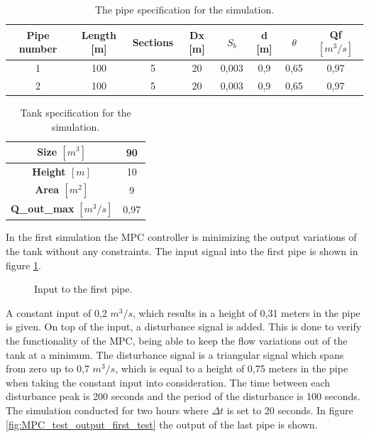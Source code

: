 \begin{table}[H]
\centering
\begin{tabular}{|c|c|c|c|c|c|c|c|}
\hline
	\rowcolor[HTML]{9B9B9B} 
\textbf{Pipe number} & \textbf{Length} [m] & \textbf{Sections} & \textbf{Dx} [m] & \textbf{$S_b$} & \textbf{d} [m] & \textbf{$\theta$} & \textbf{Qf $[m^3/s]$} \\ \hline
1&100             & 5                 & 20          & 0,003       & 0,9        & 0,65              & 0,97        \\ \hline
2&100             & 5                 & 20          & 0,003       & 0,9        & 0,65              & 0,97        \\ \hline
\end{tabular}
\caption{The pipe specification for the simulation.}
\label{tab:pipe_data_for_mpc_test}
\end{table}
\begin{table}[H]
\centering
\begin{tabular}{|c|c|}
\hline
\textbf{Size $[m^3]$}        & 90   \\ \hline
\textbf{Height $[m]$}      & 10   \\ \hline
\textbf{Area $[m^2]$}        & 9    \\ \hline
\textbf{Q\_out\_max} $[m^3/s]$& 0,97 \\ \hline
\end{tabular}
\caption{Tank specification for the simulation.}
\label{tab:tank_data_for_mpc_test}
\end{table}

In the first simulation the MPC controller is minimizing the output variations of the tank without any constraints. The input signal into the first pipe is shown in figure \ref{fig:input_to_pipe_mpc_test}. 
\begin{figure}[H]
 \centering
 
\caption{Input to the first pipe.}
\label{fig:input_to_pipe_mpc_test}
\end{figure}

A constant input of 0,2 $m^3/s$, which results in a height of 0,31 meters in the pipe is given. On top of the input, a disturbance signal is added. This is done to verify the functionality of the MPC, being able to keep the flow variations out of the tank at a minimum. The disturbance signal is a triangular signal which spans from zero up to 0,7 $m^3/s$, which is equal to a height of 0,75 meters in the pipe when taking the constant input into consideration. The time between each disturbance peak is 200 seconds and the period of the disturbance is 100 seconds. The simulation conducted for two hours where $\Delta t$ is set to 20 seconds. In figure \ref{fig:MPC_test_output_first_test} the output of the last pipe is shown.  


